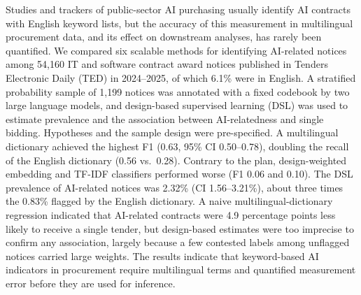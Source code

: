 Studies and trackers of public-sector AI purchasing usually identify AI contracts with English keyword lists, but the accuracy of this measurement in multilingual procurement data, and its effect on downstream analyses, has rarely been quantified. We compared six scalable methods for identifying AI-related notices among 54,160 IT and software contract award notices published in Tenders Electronic Daily (TED) in 2024--2025, of which 6.1\% were in English. A stratified probability sample of 1,199 notices was annotated with a fixed codebook by two large language models, and design-based supervised learning (DSL) was used to estimate prevalence and the association between AI-relatedness and single bidding. Hypotheses and the sample design were pre-specified. A multilingual dictionary achieved the highest F1 (0.63, 95\% CI 0.50--0.78), doubling the recall of the English dictionary (0.56 vs.\ 0.28). Contrary to the plan, design-weighted embedding and TF-IDF classifiers performed worse (F1 0.06 and 0.10). The DSL prevalence of AI-related notices was 2.32\% (CI 1.56--3.21\%), about three times the 0.83\% flagged by the English dictionary. A naive multilingual-dictionary regression indicated that AI-related contracts were 4.9 percentage points less likely to receive a single tender, but design-based estimates were too imprecise to confirm any association, largely because a few contested labels among unflagged notices carried large weights. The results indicate that keyword-based AI indicators in procurement require multilingual terms and quantified measurement error before they are used for inference.
